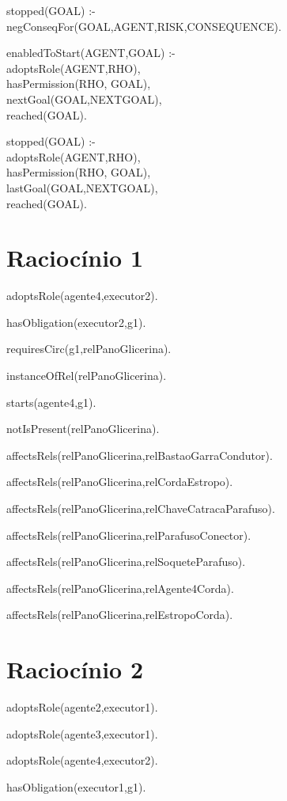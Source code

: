stopped(GOAL) :- \\ negConseqFor(GOAL,AGENT,RISK,CONSEQUENCE).

enabledToStart(AGENT,GOAL) :- \\ adoptsRole(AGENT,RHO), \\ hasPermission(RHO, GOAL), \\ nextGoal(GOAL,NEXTGOAL), \\ reached(GOAL).

stopped(GOAL) :- \\ adoptsRole(AGENT,RHO), \\ hasPermission(RHO, GOAL),\\ lastGoal(GOAL,NEXTGOAL), \\reached(GOAL).


\section{Raciocínio 1}

adoptsRole(agente4,executor2).

hasObligation(executor2,g1).

requiresCirc(g1,relPanoGlicerina).

instanceOfRel(relPanoGlicerina). 

starts(agente4,g1).

notIsPresent(relPanoGlicerina).

affectsRels(relPanoGlicerina,relBastaoGarraCondutor).

affectsRels(relPanoGlicerina,relCordaEstropo).

affectsRels(relPanoGlicerina,relChaveCatracaParafuso).

affectsRels(relPanoGlicerina,relParafusoConector).

affectsRels(relPanoGlicerina,relSoqueteParafuso).

affectsRels(relPanoGlicerina,relAgente4Corda).

affectsRels(relPanoGlicerina,relEstropoCorda).


\section{Raciocínio 2}

adoptsRole(agente2,executor1). 

adoptsRole(agente3,executor1).	 	

adoptsRole(agente4,executor2).	 

hasObligation(executor1,g1).

